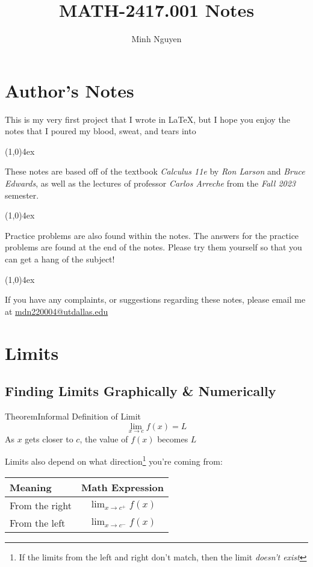 \documentclass{MathNotes}
\title{MATH-2417.001 Notes}
\author{Minh Nguyen}
\newenvironment{theorem}[1]
{\begin{GrayBox}{Theorem}{#1}}{\end{GrayBox}}
\newcommand{\br}{
\begin{center}
\line(1,0){4ex}
\end{center}}
\begin{document}
\newpage
\maketitle
{}
\tableofcontents
\newpage
\section*{Author's Notes}
This is my very first project that I wrote in \LaTeX, but I hope you enjoy
the notes that I poured my blood, sweat, and tears into  
\br
These notes are based off of the textbook \textit{Calculus 11e} by 
\textit{Ron Larson} and \textit{Bruce Edwards}, as well as the lectures of 
professor \textit{Carlos Arreche} from the \textit{Fall 2023} semester.
\br
Practice problems are also found within the notes. The answers for the practice
problems are found at the end of the notes. Please try them yourself so that
you can get a hang of the subject!
\br
If you have any complaints, or suggestions regarding these notes, please
email me at \newline\href{mailto:minh.nguyen7@utdallas.edu}{mdn220004@utdallas.edu}
\newpage
{}

\section{Limits}\label{sec:1}
\subsection{Finding Limits Graphically \& Numerically}

\begin{multicols}{2}[]
\begin{theorem}{Informal Definition of Limit}
    \[\lim_{x\to c}f(x)=L\] 
    As $x$ gets closer to $c$, the value of $f(x)$ becomes $L$
\end{theorem}


Limits also depend on what direction\footnote{If the limits from the left and
right don't match, then the limit \textit{doesn't exist}} you're coming from:
\begin{tabular}{ |l|c| }
    \hline
    Meaning & Math Expression\\
    \hline
    \hline
    From the right & $\lim_{x\to c^+}f(x)$ \\
    \hline
    From the left & $\lim_{x\to c^-}f(x)$ \\
    \hline
\end{tabular}
\end{multicols}
\end{document}
